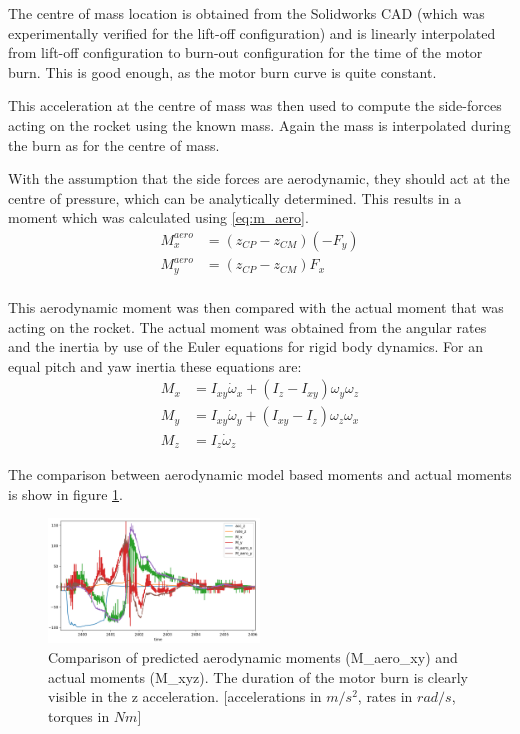 The centre of mass location is obtained from the Solidworks CAD (which was experimentally verified for the lift-off configuration) and is linearly interpolated from lift-off configuration to burn-out configuration for the time of the motor burn. This is good enough, as the motor burn curve is quite constant.

This acceleration at the centre of mass was then used to compute the side-forces acting on the rocket using the known mass. Again the mass is interpolated during the burn as for the centre of mass.

With the assumption that the side forces are aerodynamic, they should act at the centre of pressure, which can be analytically determined.
This results in a moment which was calculated using \ref{eq:m_aero}.
\begin{equation}
\label{eq:m_aero}
\begin{split}
    M^{aero}_x &= (z_{CP} - z_{CM}) (-F_y) \\
    M^{aero}_y &= (z_{CP} - z_{CM}) F_x \\
\end{split}
\end{equation}

This aerodynamic moment was then compared with the actual moment that was acting on the rocket.
The actual moment was obtained from the angular rates and the inertia by use of the Euler equations for rigid body dynamics. For an equal pitch and yaw inertia these equations are:
\begin{equation}
\begin{split}
    M_x &= I_{xy} \dot\omega_x + (I_z-I_{xy}) \omega_y \omega_z \\
    M_y &= I_{xy} \dot\omega_y + (I_{xy}-I_z) \omega_z \omega_x \\
    M_z &= I_{z} \dot\omega_z
\end{split}
\end{equation}


The comparison between aerodynamic model based moments and actual moments is show in figure \ref{fig:test_flight_graph}.
\begin{figure}[h!]
    \centering
        \includegraphics[width=0.5\textwidth]{img/test_flight_graph.png}
        \caption{Comparison of predicted aerodynamic moments (M_aero_xy) and actual moments (M_xyz). The duration of the motor burn is clearly visible in the z acceleration. [accelerations in $m/s^2$, rates in $rad/s$, torques in $Nm$]}
        \label{fig:test_flight_graph}
 \end{figure}

